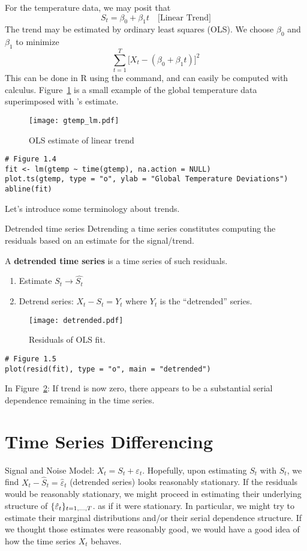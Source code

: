 For the temperature data, we may posit that
\[ S_t=\beta_0+\beta_1 t\quad\text{[Linear Trend]} \]
The trend may be estimated by ordinary least squares (OLS).
We choose $ \beta_0 $ and $ \beta_1 $ to minimize
\[ \sum_{t=1}^{T} \bigl[X_t-(\beta_0+\beta_1 t)\bigr]^2 \]
This can be done in R using the  command, and
can easily be computed with calculus. Figure~\ref{fig:gtemp_lm}
is a small example of the global temperature data superimposed
with 's estimate.
\begin{figure}[!htbp]
    \centering
    \texttt{[image: gtemp\_lm.pdf]}
    \caption{OLS estimate of linear trend}\label{fig:gtemp_lm}
\end{figure}
\begin{verbatim}
# Figure 1.4
fit <- lm(gtemp ~ time(gtemp), na.action = NULL)
plot.ts(gtemp, type = "o", ylab = "Global Temperature Deviations")
abline(fit)
\end{verbatim}
Let's introduce some terminology about trends.
\begin{Definition}{Detrended time series}{}
    Detrending a time series constitutes computing the
    residuals based on an estimate for the signal/trend.

    A \textbf{detrended time series} is a time series of such residuals.
    \begin{enumerate}
        \item Estimate $ S_t\to \hat{S_t} $
        \item Detrend series: $ X_t-\hat{S_t}=Y_t $
              where $ Y_t $ is the ``detrended'' series.
    \end{enumerate}
\end{Definition}
\begin{figure}[!htbp]
    \centering
    \texttt{[image: detrended.pdf]}
    \caption{Residuals of OLS fit.}\label{fig:detrended}
\end{figure}
\begin{verbatim}
# Figure 1.5
plot(resid(fit), type = "o", main = "detrended")
\end{verbatim}
In Figure~\ref{fig:detrended}:
If trend is now zero, there appears to be a substantial serial
dependence remaining in the time series.

\section{Time Series Differencing}
Signal and Noise Model: $ X_t=S_t+\varepsilon_t $. Hopefully,
upon estimating $ S_t $ with $ \hat{S}_t $,
we find $ X_t-\hat{S}_t=\hat{\varepsilon}_t $ (detrended series)
looks reasonably stationary. If the residuals would be
reasonably stationary, we might
proceed in estimating their underlying structure of $ \{\hat{\varepsilon}_t\}_{t=1,\ldots,T} $.
as if it were stationary. {\color{blue}In particular, we might try to estimate their marginal
        distributions and/or their serial dependence structure. If we thought those estimates
        were reasonably good, we would have a good idea of how the time series $ X_t $ behaves.}

